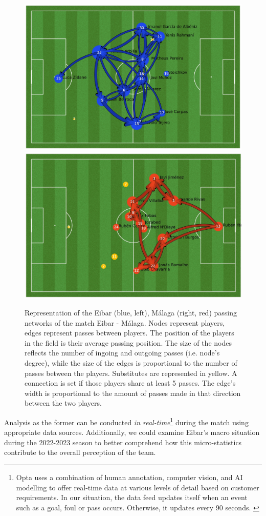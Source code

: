 \documentclass[
  twoside,nohyper]{book}
\begin{document}
\begin{figure}[H]

{\centering \includegraphics[width=0.5\linewidth,]{imagenes/home_pass_network} \includegraphics[width=0.5\linewidth,]{imagenes/away_pass_network} 

}

\caption{Representation of the Eibar (blue, left), Málaga (right, red) passing networks of the match Eibar - Málaga. Nodes represent players, edges represent passes between players. The position of the players in the field is their average passing position. The size of the nodes reflects the number of ingoing and outgoing passes (i.e. node’s degree), while the size of the edges is proportional to the number of passes between the players. Substitutes are represented in yellow. A connection is set if those players share at least 5 passes. The edge’s width is proportional to the amount of passes made in that direction between the two players.}\label{fig:homepass}
\end{figure}

Analysis as the former can be conducted \emph{in real-time}\footnote{Opta uses a combination of human annotation, computer vision, and
  AI modelling to offer real-time data at various levels of detail
  based on customer requirements. In our situation, the data feed
  updates itself when an event such as a goal, foul or pass occurs.
  Otherwise, it updates every 90 seconds. \citep{opta}} during the
match using appropriate data sources. Additionally, we could examine
Eibar's macro situation during the 2022-2023 season to better comprehend
how this micro-statistics contribute to the overall perception of the
team.
\end{document}
